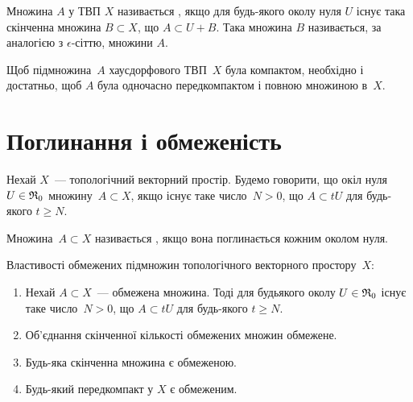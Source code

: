 \begin{definition}
    Множина $A$ у ТВП $X$ називається , якщо для будь-якого околу нуля $U$ існує така скінченна множина $B \subset X$, що $A \subset U + B$. Така множина $B$ називається, за аналогією з $\epsilon$-сіттю,  множини $A$.
\end{definition}

\begin{theorem}
    Щоб підмножина~$A$ хаусдорфового ТВП~$X$ була компактом, необхідно і достатньо, щоб $A$ була одночасно передкомпактом і повною множиною в~$X$.
\end{theorem}

\section{Поглинання і обмеженість}

\begin{definition}
    Нехай $X$~--- топологічний векторний простір. Будемо говорити, що окіл нуля $U \in \frak R_0$  множину~$A \subset X$, якщо існує таке число~$N > 0$, що $A \subset t U$ для будь-якого $t \ge N$.
\end{definition}

\begin{definition}
    Множина~$A \subset X$ називається , якщо вона поглинається кожним околом нуля.
\end{definition}

\begin{theorem}
    Властивості обмежених підмножин топологічного векторного простору~$X$:
    \begin{enumerate}
        \item Нехай $A \subset X$~--- обмежена множина. Тоді для будьякого околу $U \in \frak R_0$ існує таке число~$N > 0$, що $A \subset t U$ для будь-якого $t \ge N$.

        \item Об'єднання скінченної кількості обмежених множин обмежене.

        \item Будь-яка скінченна множина є обмеженою.

        \item Будь-який передкомпакт у $X$ є обмеженим.
    \end{enumerate}
\end{theorem}

